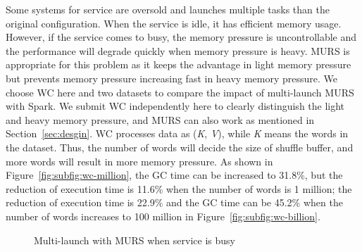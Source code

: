 Some systems for service are oversold and launches multiple tasks than the original configuration. When the service is idle, it has efficient memory usage. However, if the service comes to busy, the memory pressure is uncontrollable and the performance will degrade quickly when memory pressure is heavy. MURS is appropriate for this problem as it keeps the advantage in light memory pressure but prevents memory pressure increasing fast in heavy memory pressure. We choose WC here and two datasets to compare the impact of multi-launch MURS with Spark. We submit WC independently here to clearly distinguish the light and heavy memory pressure, and MURS can also work as mentioned in Section~\ref{sec:desgin}. WC processes data as (\textit{K}, \textit{V}), while \textit{K} means the words in the dataset. Thus, the number of words will decide the size of shuffle buffer, and more words will result in more memory pressure. As shown in Figure~\ref{fig:subfig:wc-million}, the GC time can be increased to 31.8\%, but the reduction of execution time is 11.6\% when the number of words is 1 million; the reduction of execution time is 22.9\% and the GC time can be 45.2\% when the number of words increases to 100 million in Figure~\ref{fig:subfig:wc-billion}.


\begin{figure}[!t]
\centering
{}
\hspace{-1.3ex}
\label{fig:wc-result}
\caption{Multi-launch with MURS when service is busy}
\end{figure}

